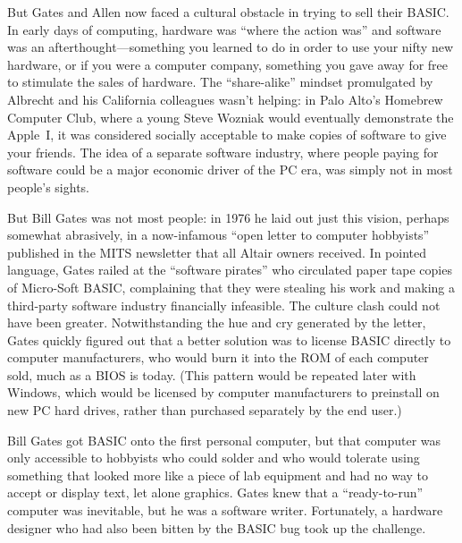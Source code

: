 But Gates and Allen now faced a cultural obstacle in trying to sell their
BASIC.
In early days of computing, hardware was ``where the action was'' and
software was an afterthought---something you learned to do in order to
use your nifty new hardware, or if you were a computer company,
something you gave away for free to stimulate the sales of hardware.
The ``share-alike'' mindset promulgated by Albrecht and his California
colleagues wasn't helping:
in Palo Alto's Homebrew
Computer Club, where a young Steve Wozniak would
eventually demonstrate the Apple~I, it
was considered socially acceptable to
make copies of software  to give your friends.
The idea of a separate software industry, where
people paying for software could be a major economic driver of the PC era,
was simply not in most people's sights.  

But Bill Gates was not most people: in 1976 he laid out just this vision,
perhaps somewhat abrasively, in a now-infamous ``open letter to computer
hobbyists'' published in the 
MITS newsletter that all Altair owners received.
In pointed language, Gates railed at the ``software pirates'' who
circulated paper tape copies of Micro-Soft BASIC, complaining that they
were stealing 
his work and making a third-party software industry financially
infeasible.
The culture clash could not have been greater.
Notwithstanding the hue and cry generated by the letter, Gates
quickly figured out that a better solution was to license BASIC directly
to computer manufacturers, who would burn it into the ROM of each
computer sold, much as a BIOS is today.
(This pattern would be repeated later with Windows, which would be
licensed by computer manufacturers to preinstall on new PC hard drives,
rather than purchased separately by the end user.)

Bill Gates got BASIC onto the first personal computer, but that computer was only
accessible to hobbyists who could solder and who would tolerate using
something that looked more like a piece of lab equipment and had no way
to accept or display text, let alone graphics.
Gates knew that a ``ready-to-run'' computer was inevitable, but he was a
software writer.  Fortunately, a hardware designer who had also been
bitten by the BASIC bug took up the challenge.




